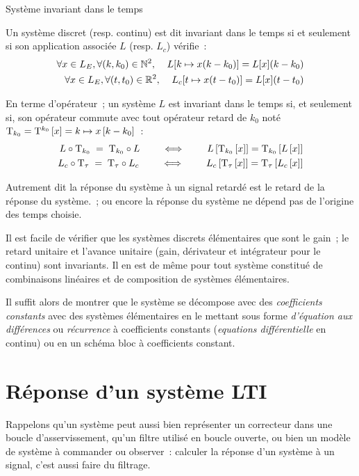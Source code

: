\begin{definition}{Système invariant dans le temps}

  Un système discret (resp. continu) est dit invariant dans le temps
  si et seulement si son application associée $L$ (resp. $L_c$)
  vérifie~:
  \begin{eqnarray}
    \forall x\in L_E, \forall (k,k_0)\in \mathbb{N}^2, \;\;\;\; L[k\mapsto x(k-k_{0})] = L[x](k-k_{0}) \\
    \forall x\in L_E, \forall (t,t_0)\in \mathbb{R}^2, \;\;\;\; L_c[t\mapsto x(t-t_{0})] = L[x](t-t_{0}) 
  \end{eqnarray}
  
  En terme d'opérateur~; un système $L$ est invariant dans le temps
  si, et seulement si, son opérateur commute avec tout opérateur
  retard de $k_0$ noté
  $\mathrm{T}_{k_0}=\mathrm{T}^{k_0}\left[x\right]= k\mapsto x\left[k-k_0\right]$~:
  \begin{eqnarray}
    \label{eq:sys_invariant}
    L\circ\mathrm{T}_{k_0} \; = \; \mathrm{T}_{k_0}\circ L  \qquad \iff \qquad  L\left[\mathrm{T}_{k_0}\left[x\right]\right] = \mathrm{T}_{k_0}\left[L\left[x\right]\right]
    \\
    L_c\circ\mathrm{T}_{\tau} \; = \; \mathrm{T}_{\tau}\circ L_c  \qquad \iff \qquad  L_c\left[\mathrm{T}_{\tau}\left[x\right]\right] = \mathrm{T}_{\tau}\left[L_c\left[x\right]\right]
  \end{eqnarray}
\end{definition}

Autrement dit \og{}la réponse du système à un signal retardé est le
retard de la réponse du système.\fg{}~; ou encore \og{} la réponse du
système ne dépend pas de l'origine des temps choisie.\fg{}



\begin{remarque}
  Il est facile de vérifier que les systèmes discrets élémentaires que
  sont le gain~; le retard unitaire et l'avance unitaire (gain,
  dérivateur et intégrateur pour le continu) sont invariants.  Il en
  est de même pour tout système constitué de combinaisons linéaires et
  de composition de systèmes élémentaires.
  
  Il suffit alors de montrer que le système se décompose avec des
  \emph{coefficients constants} avec des systèmes élémentaires en le
  mettant sous forme \emph{d'équation aux différences} ou
  \emph{récurrence} à coefficients constants (\emph{equations
    différentielle} en continu) ou en un schéma bloc à coefficients
  constant.
\end{remarque}


\section{Réponse d'un système LTI}
Rappelons qu'un système peut aussi bien représenter un correcteur dans
une boucle d'asservissement, qu'un filtre utilisé en boucle ouverte,
ou bien un modèle de système à commander ou observer~: calculer la
réponse d'un système à un signal, c'est aussi \og{}faire du
filtrage.\fg{}

